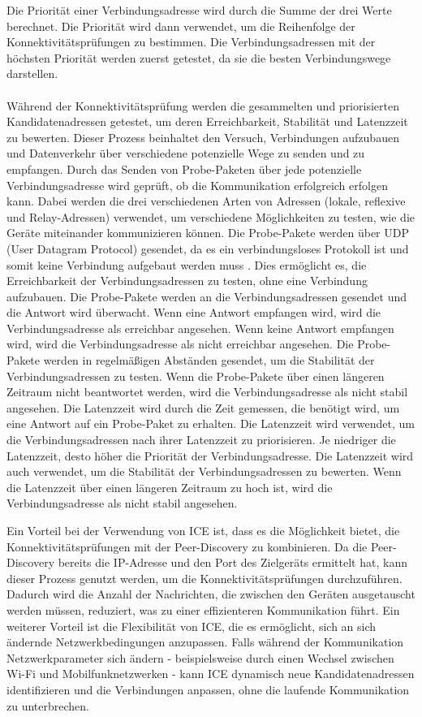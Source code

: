 Die Priorität einer Verbindungsadresse wird durch die Summe der drei Werte berechnet. Die Priorität wird dann verwendet, um die Reihenfolge der Konnektivitätsprüfungen zu bestimmen. Die Verbindungsadressen mit der höchsten Priorität werden zuerst getestet, da sie die besten Verbindungswege darstellen.
\\
\\
Während der Konnektivitätsprüfung werden die gesammelten und priorisierten Kandidatenadressen getestet, um deren Erreichbarkeit, Stabilität und Latenzzeit zu bewerten. Dieser Prozess beinhaltet den Versuch, Verbindungen aufzubauen und Datenverkehr über verschiedene potenzielle Wege zu senden und zu empfangen.
Durch das Senden von Probe-Paketen über jede potenzielle Verbindungsadresse wird geprüft, ob die Kommunikation erfolgreich erfolgen kann. Dabei werden die drei verschiedenen Arten von Adressen (lokale, reflexive und Relay-Adressen) verwendet, um verschiedene Möglichkeiten zu testen, wie die Geräte miteinander kommunizieren können. Die Probe-Pakete werden über UDP (User Datagram Protocol) gesendet, da es ein verbindungsloses Protokoll ist und somit keine Verbindung aufgebaut werden muss \parencite[S. 1]{rfc768_UDP}. Dies ermöglicht es, die Erreichbarkeit der Verbindungsadressen zu testen, ohne eine Verbindung aufzubauen. Die Probe-Pakete werden an die Verbindungsadressen gesendet und die Antwort wird überwacht. Wenn eine Antwort empfangen wird, wird die Verbindungsadresse als erreichbar angesehen. Wenn keine Antwort empfangen wird, wird die Verbindungsadresse als nicht erreichbar angesehen. Die Probe-Pakete werden in regelmäßigen Abständen gesendet, um die Stabilität der Verbindungsadressen zu testen. Wenn die Probe-Pakete über einen längeren Zeitraum nicht beantwortet werden, wird die Verbindungsadresse als nicht stabil angesehen. Die Latenzzeit wird durch die Zeit gemessen, die benötigt wird, um eine Antwort auf ein Probe-Paket zu erhalten. Die Latenzzeit wird verwendet, um die Verbindungsadressen nach ihrer Latenzzeit zu priorisieren. Je niedriger die Latenzzeit, desto höher die Priorität der Verbindungsadresse. Die Latenzzeit wird auch verwendet, um die Stabilität der Verbindungsadressen zu bewerten. Wenn die Latenzzeit über einen längeren Zeitraum zu hoch ist, wird die Verbindungsadresse als nicht stabil angesehen. 

Ein Vorteil bei der Verwendung von ICE ist, dass es die Möglichkeit bietet, die Konnektivitätsprüfungen mit der Peer-Discovery zu kombinieren. Da die Peer-Discovery bereits die IP-Adresse und den Port des Zielgeräts ermittelt hat, kann dieser Prozess genutzt werden, um die Konnektivitätsprüfungen durchzuführen. Dadurch wird die Anzahl der Nachrichten, die zwischen den Geräten ausgetauscht werden müssen, reduziert, was zu einer effizienteren Kommunikation führt. Ein weiterer Vorteil ist die Flexibilität von ICE, die es ermöglicht, sich an sich ändernde Netzwerkbedingungen anzupassen. Falls während der Kommunikation Netzwerkparameter sich ändern - beispielsweise durch einen Wechsel zwischen Wi-Fi und Mobilfunknetzwerken - kann ICE dynamisch neue Kandidatenadressen identifizieren und die Verbindungen anpassen, ohne die laufende Kommunikation zu unterbrechen.

